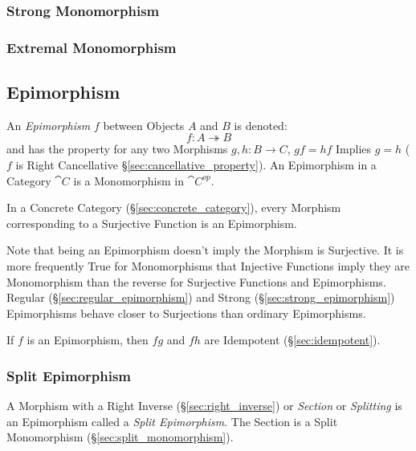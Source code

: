 \subsubsection{Strong Monomorphism}\label{sec:strong_monomorphism}

\subsubsection{Extremal Monomorphism}\label{sec:extremal_monomorphism}



\subsection{Epimorphism}\label{sec:epimorphism}

An \emph{Epimorphism} $f$ between Objects $A$ and $B$ is denoted:
\[
  f : A \twoheadrightarrow B
\]
and has the property for any two Morphisms $g, h : B \rightarrow C$,
$gf = hf$ Implies $g = h$ ($f$ is Right Cancellative
\S\ref{sec:cancellative_property}). An Epimorphism in a Category
$\cat{C}$ is a Monomorphism in $\cat{C^{op}}$.

In a Concrete Category (\S\ref{sec:concrete_category}), every Morphism
corresponding to a Surjective Function is an Epimorphism.

\fist Note that being an Epimorphism doesn't imply the Morphism
is Surjective. It is more frequently True for Monomorphisms that
Injective Functions imply they are Monomorphism than the reverse for
Surjective Functions and Epimorphisms. Regular
(\S\ref{sec:regular_epimorphism}) and Strong
(\S\ref{sec:strong_epimorphism}) Epimorphisms behave closer to
Surjections than ordinary Epimorphisms.

If $f$ is an Epimorphism, then $fg$ and $fh$ are Idempotent
(\S\ref{sec:idempotent}). %



\subsubsection{Split Epimorphism}\label{sec:split_epimorphism}

A Morphism with a Right Inverse (\S\ref{sec:right_inverse}) or
\emph{Section} or \emph{Splitting} is an Epimorphism called a
\emph{Split Epimorphism}. The Section is a Split Monomorphism
(\S\ref{sec:split_monomorphism}).


